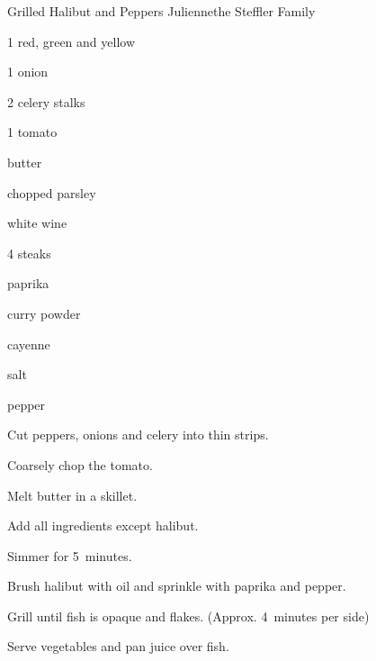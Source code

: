 \begin{recipe}{Grilled Halibut and Peppers Julienne}{the Steffler Family}{}

\begin{ingredients}
\item 1 red, green and yellow 
\item 1 onion
\item 2 celery stalks
\item 1 tomato
\item {} butter
\item {} chopped parsley
\item \C{\twothird} white wine
\item 4  steaks
\item paprika
\item curry powder
\item cayenne
\item salt
\item pepper
\end{ingredients}

\begin{directions}
\item Cut peppers, onions and celery into thin strips.
\item Coarsely chop the tomato.
\item Melt butter in a skillet.
\item Add all ingredients except halibut.
\item Simmer for 5~minutes.
\item Brush halibut with oil and sprinkle with paprika and pepper.
\item Grill until fish is opaque and flakes. (Approx. 4~minutes per side)
\item Serve vegetables and pan juice over fish.
\end{directions}
\end{recipe}
